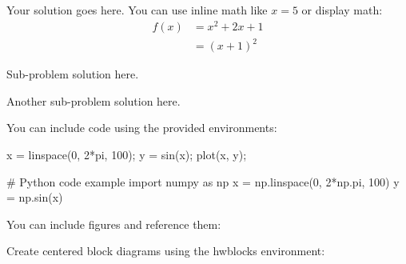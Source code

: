 \documentclass{homework}
\begin{document}


Your solution goes here. You can use inline math like $x = 5$ or display math:
\begin{align}
    f(x) &= x^2 + 2x + 1 \\
    &= (x + 1)^2
\end{align}

\subproblem
Sub-problem solution here.

\subproblem
Another sub-problem solution here.


You can include code using the provided environments:

\begin{hwmatlab}
x = linspace(0, 2*pi, 100);
y = sin(x);
plot(x, y);
\end{hwmatlab}

\begin{hwpython}
# Python code example
import numpy as np
x = np.linspace(0, 2*np.pi, 100)
y = np.sin(x)
\end{hwpython}



You can include figures and reference them:

% 


Create centered block diagrams using the hwblocks environment:

\begin{hwblocks}
\end{hwblocks}
\end{document}
